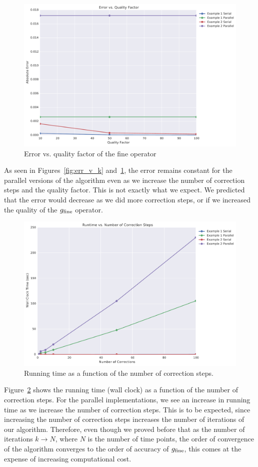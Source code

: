 \documentclass[letterpaper,12pt]{article}
\begin{document}
\begin{figure}[H]
\begin{center}
\includegraphics[width=0.75\linewidth]{data/error_vs_qualityfactor.pdf}
\caption{Error vs. quality factor of the fine operator}
\label{fig:err_v_q}
\end{center}
\end{figure}

As seen in Figures~\ref{fig:err_v_k} and~\ref{fig:err_v_q}, the error remains
constant for the parallel versions of the algorithm even as we increase the
number of correction steps and the quality factor. This is not exactly what we
expect. We predicted that the error would decrease as we did more correction
steps, or if we increased the quality of the $g_{\textnormal{fine}}$ operator. 

\begin{figure}[H]
\begin{center}
\includegraphics[width=0.75\linewidth]{data/runtime_vs_corrections.pdf}
\caption{Running time as a function of the number of correction steps.}
\label{fig:run_v_k}
\end{center}
\end{figure}

Figure~\ref{fig:run_v_k} shows the running time (wall clock) as a function of
the number of correction steps. For the parallel implementations, we see an
increase in running time as we increase the number of correction steps. This is
to be expected, since increasing the number of correction steps increases the
number of iterations of our algorithm. Therefore, even though we proved before
that as the number of iterations $k \to N$, where $N$ is the number of time
points, the order of convergence of the algorithm converges to the order of
accuracy of $g_{\textnormal{fine}}$, this comes at the expense of increasing
computational cost. 
\end{document}
